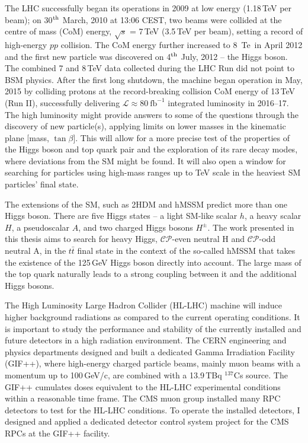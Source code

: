 The LHC successfully began its operations in 2009 at low energy (1.18\,TeV per beam); on 30$^{\tiny{\text{th}}}$ March, 2010 at 13:06 CEST, two beams were collided at the centre of mass (CoM) energy, $\sqrt{s}$ = 7\,TeV (3.5\,TeV per beam), setting a record of high-energy $pp$ collision. The CoM energy further increased to 8~Te\, in April 2012 and the first new particle was discovered on 4$^{\tiny{\text{th}}}$ July, 2012 – the Higgs boson. The combined 7 and 8\,TeV data collected during the LHC Run did not point to BSM physics. After the first long shutdown, the machine began operation in May, 2015 by colliding protons at the record-breaking collision CoM energy of 13\,TeV (Run II), successfully delivering $\mathcal{L}\approx 80~\text{fb}^{-1}$ integrated luminosity in 2016–17. The high luminosity might provide answers to some of the questions through the discovery of new particle(s), applying limits on lower masses in the kinematic plane [mass, $\tan\beta$]. This will allow for a more precise test of the properties of the Higgs boson and top quark pair and the exploration of its rare decay modes, where deviations from the SM might be found. It will also open a window for searching for particles using high-mass ranges up to TeV scale in the heaviest SM particles’ final state.

The extensions of the SM, such as 2HDM and hMSSM predict more than one Higgs boson. There are five Higgs states – a light SM-like scalar $h$, a heavy scalar $H$, a pseudoscalar $A$, and two charged Higgs bosons $H^\pm$. The work presented in this thesis aims to search for heavy Higgs, $\mathcal{CP}$-even neutral H and $\mathcal{CP}$-odd neutral A, in the $t\bar t$ final state in the context of the so-called hMSSM that takes the existence of the 125\,GeV Higgs boson directly into account. The large mass of the top quark naturally leads to a strong coupling between it and the additional Higgs bosons. 

The High Luminosity Large Hadron Collider (HL-LHC) machine will induce higher background radiations as compared to the current operating conditions. It is important to study the performance and stability of the currently installed and future detectors in a high radiation environment. The CERN engineering and physics departments designed and built a dedicated Gamma Irradiation Facility (GIF++), where high-energy charged particle beams, mainly muon beams with a momentum up to 100\,GeV/c, are combined with a 13.9\,TBq $^{137}$Cs source. The GIF++ cumulates doses equivalent to the HL-LHC experimental conditions within a reasonable time frame. The CMS muon group installed many RPC detectors to test for the HL-LHC conditions. To operate the installed detectors, I designed and applied a dedicated detector control system project for the CMS RPCs at the GIF++ facility.

